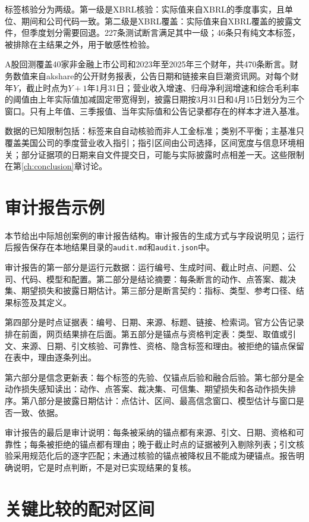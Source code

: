 标签核验分为两级。第一级是XBRL核验：实际值来自XBRL的季度事实，且单位、期间和公司代码一致。第二级是XBRL覆盖：实际值来自XBRL覆盖的披露文件，但季度划分需要回退。227条测试断言满足其中一级；46条只有纯文本标签，被排除在主结果之外，用于敏感性检验。

A股回测覆盖40家非金融上市公司和2023年至2025年三个财年，共470条断言。财务数值来自akshare的公开财务报表，公告日期和链接来自巨潮资讯网。对每个财年$Y$，截止时点为$Y+1$年1月31日；营业收入增速、归母净利润增速和综合毛利率的阈值由上年实际值加减固定带宽得到，披露日期按3月31日和4月15日划分为三个窗口。只有上年值、三季报值、当年实际值和公告记录都存在的样本才进入基准。

数据的已知限制包括：标签来自自动核验而非人工金标准；类别不平衡；主基准只覆盖美国公司的季度营业收入指引；指引区间由公司选择，区间宽度与信息环境相关；部分证据项的日期来自文件提交日，可能与实际披露时点相差一天。这些限制在第\ref{ch:conclusion}章讨论。

\chapter{审计报告示例}
\label{app:audit}

本节给出中际旭创案例的审计报告结构。审计报告的生成方式与字段说明见；运行后报告保存在本地结果目录的\texttt{audit.md}和\texttt{audit.json}中。

审计报告的第一部分是运行元数据：运行编号、生成时间、截止时点、问题、公司、代码、模型和配置。第二部分是结论摘要：每条断言的动作、点答案、裁决集、期望损失和披露日期估计。第三部分是断言契约：指标、类型、参考口径、结果标签及其定义。

第四部分是时点证据表：编号、日期、来源、标题、链接、检索词。官方公告记录排在前面，网页结果排在后面。第五部分是锚点与资格判定表：类型、取值或引文、来源、日期、引文核验、可靠性、资格、隐含标签和理由。被拒绝的锚点保留在表中，理由逐条列出。

第六部分是信念更新表：每个标签的先验、仅锚点后验和融合后验。第七部分是全动作损失感知读出：动作、点答案、裁决集、可信集、期望损失和各动作损失排序。第八部分是披露日期估计：点估计、区间、最高信念窗口、模型估计与窗口是否一致、依据。

审计报告的最后是审计说明：每条被采纳的锚点都有来源、引文、日期、资格和可靠性；每条被拒绝的锚点都有理由；晚于截止时点的证据被列入剔除列表；引文核验采用规范化后的逐字匹配；未通过核验的锚点被降权且不能成为硬锚点。报告明确说明，它是时点判断，不是对已实现结果的复核。

\chapter{关键比较的配对区间}
\label{app:paired}


